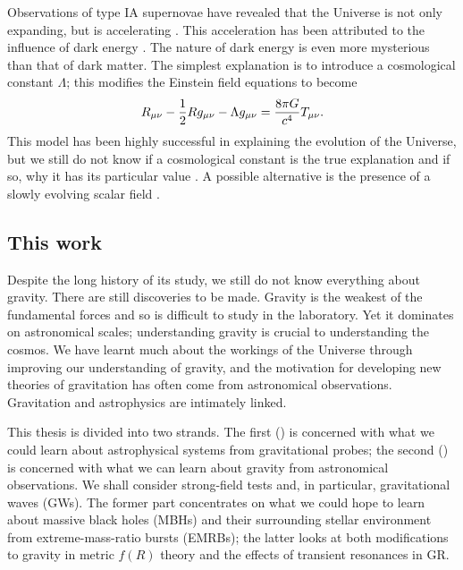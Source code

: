 Observations of type IA supernovae have revealed that the Universe is not only expanding, but is accelerating \citep{Riess1998,Perlmutter1999}. This acceleration has been attributed to the influence of dark energy \citep{Perlmutter1999a,Peebles2003}. The nature of dark energy is even more mysterious than that of dark matter. The simplest explanation is to introduce a cosmological constant $\Lambda$; this modifies the Einstein field equations to become \citep[document 43]{Einstein1997}
\begin{equation}
R_{\mu\nu} - \dfrac{1}{2}R g_{\mu\nu} - \Lambda g_{\mu\nu} = \dfrac{8\pi G}{c^4}T_{\mu\nu}.
\end{equation}
This model has been highly successful in explaining the evolution of the Universe, but we still do not know if a cosmological constant is the true explanation and if so, why it has its particular value \citep{Carroll2001}. A possible alternative is the presence of a slowly evolving scalar field \citep{Copeland2006}.

\subsection{This work}

Despite the long history of its study, we still do not know everything about gravity. There are still discoveries to be made. Gravity is the weakest of the fundamental forces and so is difficult to study in the laboratory. Yet it dominates on astronomical scales; understanding gravity is crucial to understanding the cosmos. We have learnt much about the workings of the Universe through improving our understanding of gravity, and the motivation for developing new theories of gravitation has often come from astronomical observations. Gravitation and astrophysics are intimately linked.

This thesis is divided into two strands. The first () is concerned with what we could learn about astrophysical systems from gravitational probes; the second () is concerned with what we can learn about gravity from astronomical observations. We shall consider strong-field tests and, in particular, gravitational waves (GWs). The former part concentrates on what we could hope to learn about massive black holes (MBHs) and their surrounding stellar environment from extreme-mass-ratio bursts (EMRBs); the latter looks at both modifications to gravity in metric $f(R)$ theory and the effects of transient resonances in GR.

